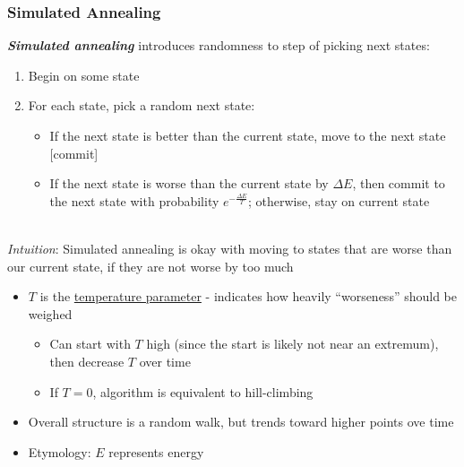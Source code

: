 \documentclass[12pt]{extarticle}
\theoremstyle{definition}
\theoremstyle{remark}
\newcommand{\pstart}[0]{\noindent}
\newcommand{\newp}[0]{~\\ \pstart}
\newcommand{\term}[1]{\noindent\textbf{\textit{#1}}}
\begin{document}
\subsubsection{Simulated Annealing}
\pstart
\term{Simulated annealing} introduces randomness to step of picking next states: \begin{enumerate}
    \item Begin on some state
    \item For each state, pick a random next state: \begin{itemize}
        \item If the next state is better than the current state, move to the next state [commit]
        \item If the next state is worse than the current state by $\Delta E$, then commit to the next state with probability $e^{-\frac{\Delta E}{T}}$; otherwise, stay on current state
    \end{itemize}
\end{enumerate}

\newp
\textit{Intuition}: Simulated annealing is okay with moving to states that are worse than our current state, if they are not worse by too much \begin{itemize}
    \item $T$ is the \ul{temperature parameter} - indicates how heavily ``worseness'' should be weighed \begin{itemize}
        \item Can start with $T$ high (since the start is likely not near an extremum), then decrease $T$ over time
        \item If $T=0$, algorithm is equivalent to hill-climbing
    \end{itemize}
    \item Overall structure is a random walk, but trends toward higher points ove time
    \item Etymology: $E$ represents energy
\end{itemize}
\end{document}

